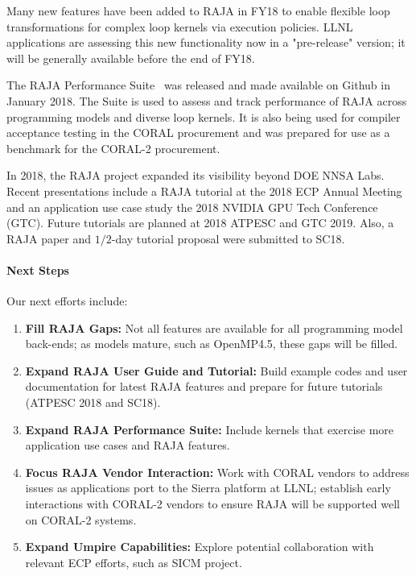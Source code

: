 Many new features have been added to RAJA in FY18 to enable flexible
loop transformations for complex loop kernels via execution policies.
LLNL applications are assessing this new functionality now in a 
"pre-release" version; it will be generally available before the end of FY18.

The RAJA Performance Suite~\cite{RAJAPerf-github} was released and made 
available on Github in January 2018. The Suite is used to assess and track 
performance of RAJA across programming models and diverse loop 
kernels. It is also being used for compiler acceptance testing in the CORAL 
procurement and was prepared for use as a benchmark for the CORAL-2 procurement.

In 2018, the RAJA project expanded its visibility beyond DOE NNSA Labs. 
Recent presentations include a RAJA tutorial at the 2018 ECP Annual Meeting 
and an application use case study the 2018 NVIDIA GPU Tech Conference (GTC). 
Future tutorials are planned at 2018 ATPESC and GTC 2019. Also, a RAJA paper 
and $1/2$-day tutorial proposal were submitted to SC18.

\paragraph{Next Steps}

Our next efforts include:
\begin{enumerate}
\item {\bf Fill RAJA Gaps:} Not all features are available for all programming
  model back-ends; as models mature, such as OpenMP4.5, these gaps will be
    filled.
\item {\bf Expand RAJA User Guide and Tutorial:} Build example codes and user
  documentation for latest RAJA features and prepare for future tutorials
    (ATPESC 2018 and SC18).
\item {\bf Expand RAJA Performance Suite:} Include kernels that exercise more
  application use cases and RAJA features.
\item {\bf Focus RAJA Vendor Interaction:} Work with CORAL vendors to address
  issues as applications port to the Sierra platform at LLNL; establish early
    interactions with CORAL-2 vendors to ensure RAJA will be supported well on
    CORAL-2 systems.
\item {\bf Expand Umpire Capabilities:} Explore potential collaboration with
  relevant ECP efforts, such as SICM project.
\end{enumerate}
